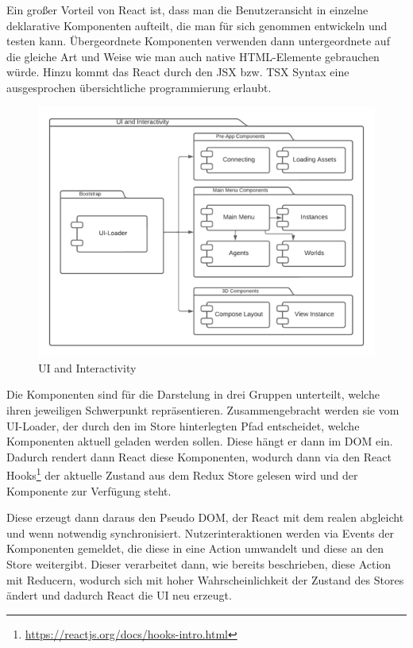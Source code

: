 Ein großer Vorteil von React ist, dass man die Benutzeransicht in einzelne deklarative Komponenten aufteilt, die man für sich genommen entwickeln und testen kann.
Übergeordnete Komponenten verwenden dann untergeordnete auf die gleiche Art und Weise wie man auch native HTML-Elemente gebrauchen würde.
Hinzu kommt das React durch den JSX bzw. TSX Syntax eine ausgesprochen übersichtliche programmierung erlaubt.

\begin{figure}[htb]
    \centering
    \includegraphics[scale=.65,center]{medien/ui-and-interactivity.pdf}
    \caption{UI and Interactivity}
    \ownsource
    \label{fig:ui-and-interactivity}
\end{figure}


Die Komponenten sind für die Darstelung in drei Gruppen unterteilt, welche ihren jeweiligen Schwerpunkt repräsentieren.
Zusammengebracht werden sie vom UI-Loader, der durch den im Store hinterlegten Pfad entscheidet, welche Komponenten aktuell geladen werden sollen.
Diese hängt er dann im DOM ein.
Dadurch rendert dann React diese Komponenten, wodurch dann via den React Hooks\footnote{\url{https://reactjs.org/docs/hooks-intro.html}} der aktuelle Zustand aus dem Redux Store gelesen wird und der Komponente zur Verfügung steht.

Diese erzeugt dann daraus den Pseudo DOM, der React mit dem realen abgleicht und wenn notwendig synchronisiert.
Nutzerinteraktionen werden via Events der Komponenten gemeldet, die diese in eine Action umwandelt und diese an den Store weitergibt.
Dieser verarbeitet dann, wie bereits beschrieben, diese Action mit Reducern, wodurch sich mit hoher Wahrscheinlichkeit der Zustand des Stores ändert und dadurch React die UI neu erzeugt.

